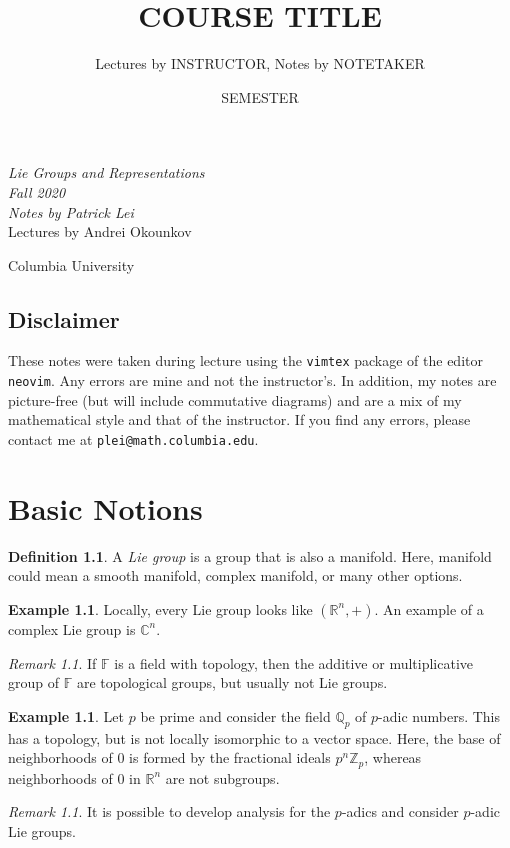 \documentclass[leqno, openany]{memoir}
\title{COURSE TITLE}
\author{Lectures by INSTRUCTOR, Notes by NOTETAKER}
\date{SEMESTER}
\theoremstyle{definition}
\newtheorem{defn}[thm]{Definition}
\newtheorem{exm}[thm]{Example}
\theoremstyle{remark}
\newtheorem{rmk}[thm]{Remark}
\theoremstyle{plain}
\theoremstyle{definition}
\theoremstyle{remark}
\newcommand{\R}{\mathbb{R}}
\newcommand{\C}{\mathbb{C}}
\newcommand{\Z}{\mathbb{Z}}
\newcommand{\Q}{\mathbb{Q}}
\newcommand*{\titleSW}
    {\begingroup%
    \raggedleft
    \vspace*{\baselineskip}
    {\Huge\itshape Lie Groups and Representations \\ Fall 2020}\\[\baselineskip]
    {\large\itshape Notes by Patrick Lei}\\[0.2\textheight]
    {\Large Lectures by Andrei Okounkov}\par
    \vfill
    {\Large \sffamily Columbia University}
    \vspace*{\baselineskip}
\endgroup}
\begin{document}
    
\begin{titlingpage}
\titleSW
\end{titlingpage}

\thispagestyle{empty}
\section*{Disclaimer}%
\label{sec:disclaimer}

These notes were taken during lecture using the \texttt{vimtex} package of the editor \texttt{neovim}. 
Any errors are mine and not the instructor's. 
In addition, my notes are picture-free (but will include commutative diagrams) and are a mix of my mathematical style and that of the instructor.
If you find any errors, please contact me at \texttt{plei@math.columbia.edu}.
\newpage



\tableofcontents

\chapter{Basic Notions}%
\label{cha:basic_notions}

\begin{defn}
    A \textit{Lie group} is a group that is also a manifold. Here, manifold could mean a smooth manifold, complex manifold, or many other options.
\end{defn}

\begin{exm}
    Locally, every Lie group looks like $(\R^n, +)$. An example of a complex Lie group is $\C^n$.
\end{exm}

\begin{rmk}
    If $\mathbb{F}$ is a field with topology, then the additive or multiplicative group of $\mathbb{F}$ are topological groups, but usually not Lie groups.
\end{rmk}

\begin{exm}
    Let $p$ be prime and consider the field $\Q_p$ of $p$-adic numbers. This has a topology, but is not locally isomorphic to a vector space. Here, the base of neighborhoods of $0$ is formed by the fractional ideals $p^n \Z_p$, whereas neighborhoods of $0$ in $\R^n$ are not subgroups.
\end{exm}

\begin{rmk}
    It is possible to develop analysis for the $p$-adics and consider $p$-adic Lie groups.
\end{rmk}
\end{document}
